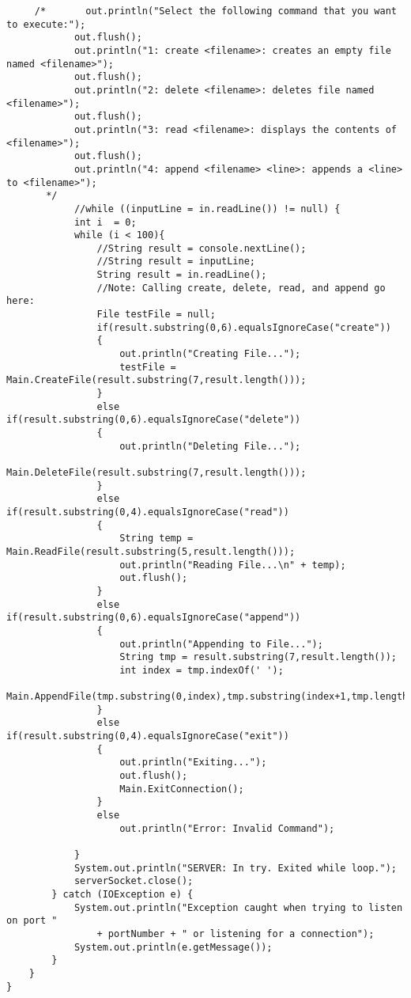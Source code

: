 \documentclass{article}
\begin{document}
\begin{lstlisting}
     /*       out.println("Select the following command that you want to execute:");
            out.flush();
    		out.println("1: create <filename>: creates an empty file named <filename>");
    		out.flush();
    		out.println("2: delete <filename>: deletes file named <filename>");
    		out.flush();
    		out.println("3: read <filename>: displays the contents of <filename>");
    		out.flush();
    		out.println("4: append <filename> <line>: appends a <line> to <filename>");
       */     
            //while ((inputLine = in.readLine()) != null) {
            int i  = 0;
            while (i < 100){	
        		//String result = console.nextLine();
        		//String result = inputLine;
            	String result = in.readLine();
        		//Note: Calling create, delete, read, and append go here:
        		File testFile = null;
        		if(result.substring(0,6).equalsIgnoreCase("create"))
        		{
        			out.println("Creating File...");
        			testFile = Main.CreateFile(result.substring(7,result.length()));
        		}
        		else if(result.substring(0,6).equalsIgnoreCase("delete"))
        		{
        			out.println("Deleting File...");
        			Main.DeleteFile(result.substring(7,result.length()));
        		}
        		else if(result.substring(0,4).equalsIgnoreCase("read"))
        		{
        			String temp = Main.ReadFile(result.substring(5,result.length()));
        			out.println("Reading File...\n" + temp);
        			out.flush();
        		}
        		else if(result.substring(0,6).equalsIgnoreCase("append"))
        		{
        			out.println("Appending to File...");
        			String tmp = result.substring(7,result.length());
        			int index = tmp.indexOf(' ');
        			Main.AppendFile(tmp.substring(0,index),tmp.substring(index+1,tmp.length()));
        		}
        		else if(result.substring(0,4).equalsIgnoreCase("exit"))
        		{
        			out.println("Exiting...");
        			out.flush();
        			Main.ExitConnection();
        		}
        		else
        			out.println("Error: Invalid Command");
        		            	
            }
            System.out.println("SERVER: In try. Exited while loop.");
            serverSocket.close();
        } catch (IOException e) {
            System.out.println("Exception caught when trying to listen on port "
                + portNumber + " or listening for a connection");
            System.out.println(e.getMessage());
        }
    }
}
		\end{lstlisting}
\end{document}
